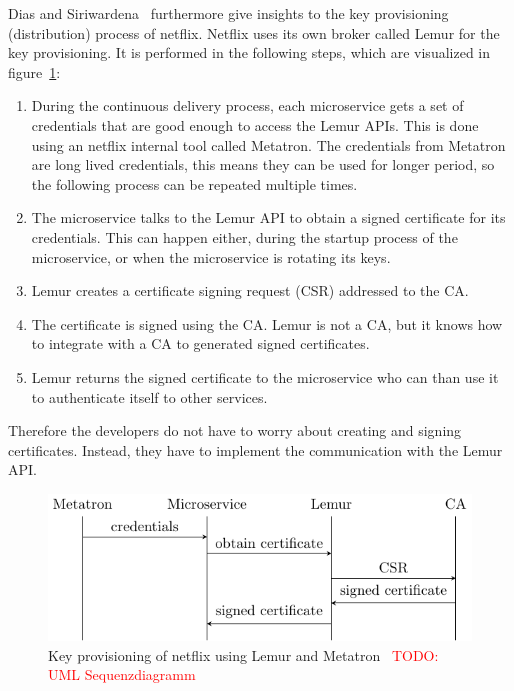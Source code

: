 Dias and Siriwardena~\cite{dias2020microservices} furthermore give insights to the key provisioning (distribution) process of netflix.
Netflix uses its own broker called Lemur for the key provisioning.
It is performed in the following steps, which are visualized in figure~\ref{fig:key_provisioning_netflix}:
\begin{enumerate}
    \item During the continuous delivery process, each microservice gets a set of credentials that are good enough to access the Lemur APIs.
		This is done using an netflix internal tool called Metatron.
		The credentials from Metatron are long lived credentials, this means they can be used for longer period, so the following process can be repeated multiple times.
    \item The microservice talks to the Lemur API to obtain a signed certificate for its credentials.
		This can happen either, during the startup process of the microservice, or when the microservice is rotating its keys.
    \item Lemur creates a certificate signing request (CSR) addressed to the CA.
    \item The certificate is signed using the CA.
		Lemur is not a CA, but it knows how to integrate with a CA to generated signed certificates.
    \item Lemur returns the signed certificate to the microservice who can than use it to authenticate itself to other services.
\end{enumerate}
Therefore the developers do not have to worry about creating and signing certificates.
Instead, they have to implement the communication with the Lemur API.


\begin{figure}
	\centering
	\includegraphics{images/related-work/netflix-provisioning.pdf}
	\caption{Key provisioning of netflix using Lemur and Metatron~\cite{dias2020microservices} \textcolor{red}{TODO: UML Sequenzdiagramm}}
	\label{fig:key_provisioning_netflix}
\end{figure}

